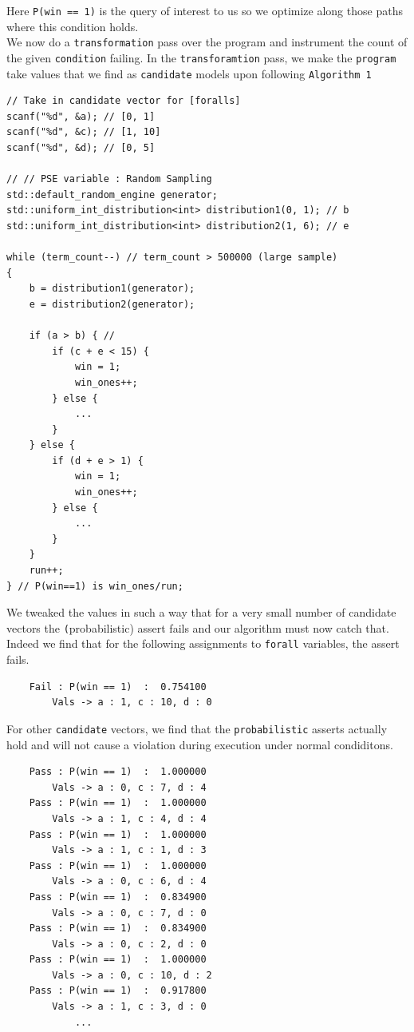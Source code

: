 \documentclass{article}
\begin{document}
Here \texttt{P(win == 1)} is the query of interest to us so we optimize along those paths where this condition holds. \\   

We now do a \texttt{transformation} pass over the program and instrument the count of the given \texttt{condition} failing. In the \texttt{transforamtion} pass, we make the \texttt{program} take values that we find as \texttt{candidate} models upon following \texttt{Algorithm 1}

\begin{verbatim}
// Take in candidate vector for [foralls]
scanf("%d", &a); // [0, 1]
scanf("%d", &c); // [1, 10]
scanf("%d", &d); // [0, 5]

// // PSE variable : Random Sampling
std::default_random_engine generator;
std::uniform_int_distribution<int> distribution1(0, 1); // b
std::uniform_int_distribution<int> distribution2(1, 6); // e

while (term_count--) // term_count > 500000 (large sample)
{
	b = distribution1(generator);
	e = distribution2(generator);
	
	if (a > b) { // 
		if (c + e < 15) {
			win = 1;
			win_ones++;
		} else {
			...
		}
	} else {
		if (d + e > 1) {
			win = 1;
			win_ones++;
		} else {
			...
		}
	}
	run++;
} // P(win==1) is win_ones/run;
\end{verbatim}

We tweaked the values in such a way that for a very small number of candidate vectors the \texttt(probabilistic) assert fails and our algorithm must now catch that. Indeed we find that for the following assignments to \texttt{forall} variables, the assert fails.

\begin{verbatim}
	Fail : P(win == 1)  :  0.754100
		Vals -> a : 1, c : 10, d : 0
\end{verbatim}

For other \texttt{candidate} vectors, we find that the \texttt{probabilistic} asserts actually hold and will not cause a violation during execution under normal condiditons. 

\begin{verbatim}
	Pass : P(win == 1)  :  1.000000
		Vals -> a : 0, c : 7, d : 4
	Pass : P(win == 1)  :  1.000000
		Vals -> a : 1, c : 4, d : 4
	Pass : P(win == 1)  :  1.000000
		Vals -> a : 1, c : 1, d : 3
	Pass : P(win == 1)  :  1.000000
		Vals -> a : 0, c : 6, d : 4
	Pass : P(win == 1)  :  0.834900
		Vals -> a : 0, c : 7, d : 0
	Pass : P(win == 1)  :  0.834900
		Vals -> a : 0, c : 2, d : 0
	Pass : P(win == 1)  :  1.000000
		Vals -> a : 0, c : 10, d : 2
	Pass : P(win == 1)  :  0.917800
		Vals -> a : 1, c : 3, d : 0
			...
\end{verbatim}
\end{document}
